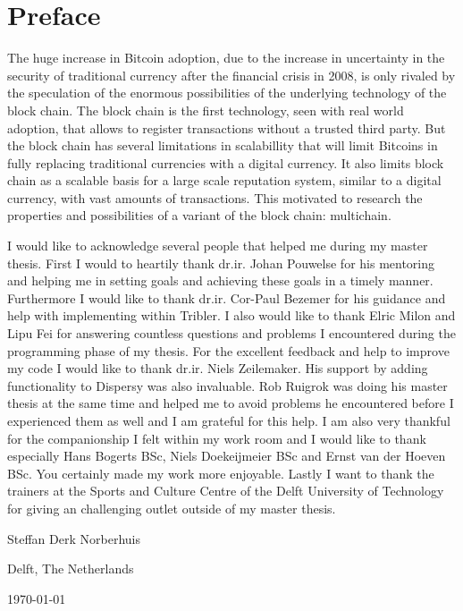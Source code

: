 \chapter*{Preface}
The huge increase in Bitcoin adoption, 
due to the increase in uncertainty in the security of traditional currency 
after the financial crisis in 2008, 
is only rivaled by the speculation of the enormous possibilities 
of the underlying technology of the block chain.
The block chain is the first technology, seen with real world adoption,
that allows to register transactions without a trusted third party.
But the block chain has several limitations in scalabillity 
that will limit Bitcoins in fully replacing traditional currencies with a digital currency.
It also limits block chain as a scalable basis for a large scale reputation system, 
similar to a digital currency, with vast amounts of transactions.
This motivated to research the properties and possibilities of a variant of the block chain:
multichain.

\vspace{1\baselineskip}

\noindent
I would like to acknowledge several people that helped me during my master thesis.
First I would to heartily thank dr.ir. Johan Pouwelse for his mentoring and helping me in setting goals and achieving these goals in a timely manner.
Furthermore I would like to thank dr.ir. Cor-Paul Bezemer for his guidance and help with implementing within Tribler. 
I also would like to thank Elric Milon and Lipu Fei for answering countless questions and problems I encountered during the programming phase of my thesis.
For the excellent feedback and help to improve my code I would like to thank dr.ir. Niels Zeilemaker.
His support by adding functionality to Dispersy was also invaluable.
Rob Ruigrok was doing his master thesis at the same time
and helped me to avoid problems he encountered before I experienced them as well and
I am grateful for this help.
I am also very thankful for the companionship I felt within my work room 
and I would like to thank especially Hans Bogerts BSc, Niels Doekeijmeier BSc and Ernst van der Hoeven BSc.
You certainly made my work more enjoyable.
Lastly I want to thank the trainers at the Sports and Culture Centre of the Delft University of Technology for giving an challenging outlet outside of my master thesis.

\vspace{1\baselineskip}

\noindent
Steffan Derk Norberhuis

\vspace{1\baselineskip}

\noindent
Delft, The Netherlands

\noindent
\today
